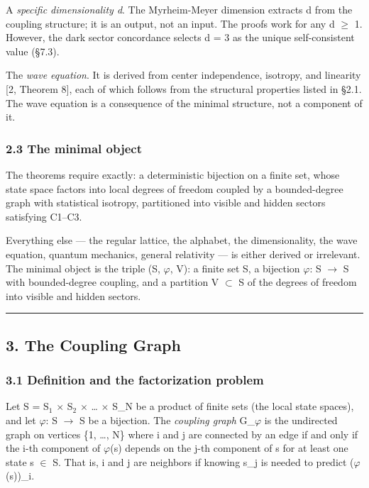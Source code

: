 \documentclass[
  11pt,
]{article}
\begin{document}
A \emph{specific dimensionality d}. The Myrheim-Meyer dimension extracts
d from the coupling structure; it is an output, not an input. The proofs
work for any d \ensuremath{\geq} 1. However, the dark sector concordance selects d = 3
as the unique self-consistent value (§7.3).

The \emph{wave equation}. It is derived from center independence,
isotropy, and linearity {[}2, Theorem 8{]}, each of which follows from
the structural properties listed in §2.1. The wave equation is a
consequence of the minimal structure, not a component of it.

\hypertarget{the-minimal-object}{%
\subsubsection{2.3 The minimal object}\label{the-minimal-object}}

The theorems require exactly: a deterministic bijection on a finite set,
whose state space factors into local degrees of freedom coupled by a
bounded-degree graph with statistical isotropy, partitioned into visible
and hidden sectors satisfying C1--C3.

Everything else --- the regular lattice, the alphabet, the
dimensionality, the wave equation, quantum mechanics, general relativity
--- is either derived or irrelevant. The minimal object is the triple
(S, \ensuremath{\varphi}, V): a finite set S, a bijection \ensuremath{\varphi}: S \ensuremath{\to} S with bounded-degree
coupling, and a partition V \ensuremath{\subset} S of the degrees of freedom into visible
and hidden sectors.

\begin{center}\rule{0.5\linewidth}{0.5pt}\end{center}

\hypertarget{the-coupling-graph}{%
\subsection{3. The Coupling Graph}\label{the-coupling-graph}}

\hypertarget{definition-and-the-factorization-problem}{%
\subsubsection{3.1 Definition and the factorization
problem}\label{definition-and-the-factorization-problem}}

Let S = S\ensuremath{_1} \ensuremath{\times} S\ensuremath{_2} \ensuremath{\times} \ldots{} \ensuremath{\times} S\_N be a product of finite sets (the local
state spaces), and let \ensuremath{\varphi}: S \ensuremath{\to} S be a bijection. The \emph{coupling
graph} G\_\ensuremath{\varphi} is the undirected graph on vertices \{1, \ldots, N\} where i
and j are connected by an edge if and only if the i-th component of \ensuremath{\varphi}(s)
depends on the j-th component of s for at least one state s \ensuremath{\in} S. That
is, i and j are neighbors if knowing s\_j is needed to predict
(\ensuremath{\varphi}(s))\_i.
\end{document}
